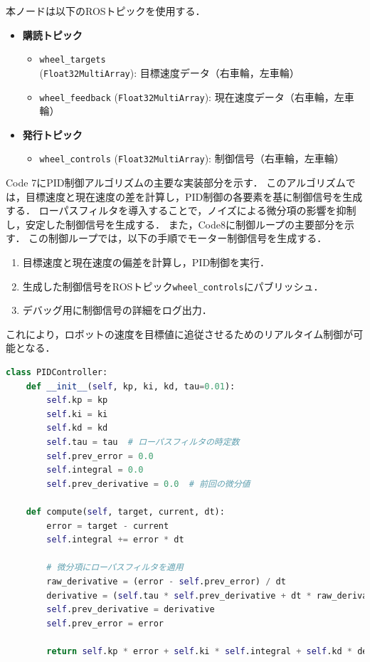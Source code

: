 本ノードは以下のROSトピックを使用する．
\begin{itemize}
    \item \textbf{購読トピック}
          \begin{itemize}
              \item \texttt{wheel\_targets} (\texttt{Float32MultiArray}): 目標速度データ（右車輪，左車輪）
              \item \texttt{wheel\_feedback} (\texttt{Float32MultiArray}): 現在速度データ（右車輪，左車輪）
          \end{itemize}
    \item \textbf{発行トピック}
          \begin{itemize}
              \item \texttt{wheel\_controls} (\texttt{Float32MultiArray}): 制御信号（右車輪，左車輪）
          \end{itemize}
\end{itemize}

Code 7にPID制御アルゴリズムの主要な実装部分を示す．
このアルゴリズムでは，目標速度と現在速度の差を計算し，PID制御の各要素を基に制御信号を生成する．
ローパスフィルタを導入することで，ノイズによる微分項の影響を抑制し，安定した制御信号を生成する．
また，Code8に制御ループの主要部分を示す．
この制御ループでは，以下の手順でモーター制御信号を生成する．
\begin{enumerate}
    \item 目標速度と現在速度の偏差を計算し，PID制御を実行．
    \item 生成した制御信号をROSトピック\texttt{wheel\_controls}にパブリッシュ．
    \item デバッグ用に制御信号の詳細をログ出力．
\end{enumerate}
これにより，ロボットの速度を目標値に追従させるためのリアルタイム制御が可能となる．

\newpage
\begin{lstlisting}[language=Python, caption=PID制御アルゴリズムの実装 (PID\_node.py)]
class PIDController:
    def __init__(self, kp, ki, kd, tau=0.01):
        self.kp = kp
        self.ki = ki
        self.kd = kd
        self.tau = tau  # ローパスフィルタの時定数
        self.prev_error = 0.0
        self.integral = 0.0
        self.prev_derivative = 0.0  # 前回の微分値

    def compute(self, target, current, dt):
        error = target - current
        self.integral += error * dt

        # 微分項にローパスフィルタを適用
        raw_derivative = (error - self.prev_error) / dt
        derivative = (self.tau * self.prev_derivative + dt * raw_derivative) / (self.tau + dt)
        self.prev_derivative = derivative
        self.prev_error = error

        return self.kp * error + self.ki * self.integral + self.kd * derivative
\end{lstlisting}

